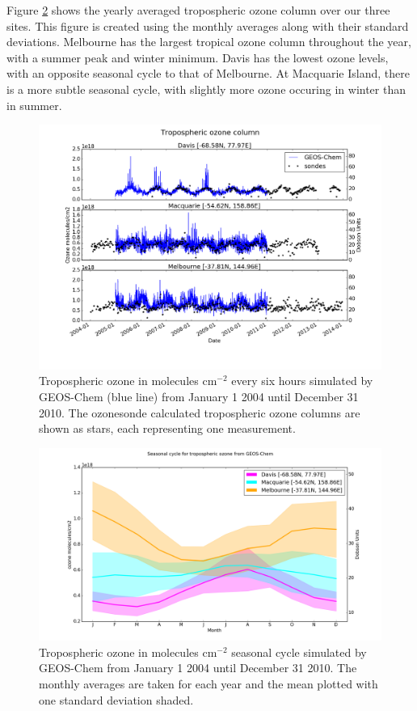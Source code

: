     Figure \ref{ch_o3:fig:YearlyCyclGEOSChem} shows the yearly averaged tropospheric ozone column over our three sites.
    This figure is created using the monthly averages along with their standard deviations.
    Melbourne has the largest tropical ozone column throughout the year, with a summer peak and winter minimum.
    Davis has the lowest ozone levels, with an opposite seasonal cycle to that of Melbourne.
    At Macquarie Island, there is a more subtle seasonal cycle, with slightly more ozone occuring in winter than in summer.
    
    \begin{figure}[!htbp]
      \includegraphics[width=\textwidth]{Figures/Ozone/StationSeries.png}
      \caption{Tropospheric ozone in molecules cm$^{-2}$ every six hours simulated by GEOS-Chem (blue line) from January 1 2004 until December 31 2010. The ozonesonde calculated tropospheric ozone columns are shown as stars, each representing one measurement. }
      \label{ch_o3:fig:StationSeriesGEOSChem}
    \end{figure}
    
    \begin{figure}[!htbp]
      \includegraphics[width=\textwidth]{Figures/Ozone/Yearly_cycle.png}
      \caption{Tropospheric ozone in molecules cm$^{-2}$ seasonal cycle simulated by GEOS-Chem from January 1 2004 until December 31 2010. The monthly averages are taken for each year and the mean plotted with one standard deviation shaded.}
      \label{ch_o3:fig:YearlyCyclGEOSChem}
    \end{figure}
    
